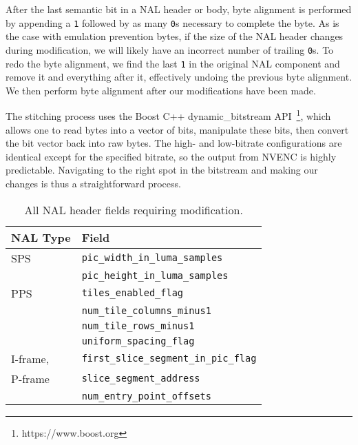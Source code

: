 After the last semantic bit in a NAL header or body, byte alignment is performed by appending a \texttt{1} followed by as many \texttt{0}s necessary to complete the byte. As is the case with emulation prevention bytes, if the size of the NAL header changes during modification, we will likely have an incorrect number of trailing \texttt{0}s. To redo the byte alignment, we find the last \texttt{1} in the original NAL component and remove it and everything after it, effectively undoing the previous byte alignment. We then perform byte alignment after our modifications have been made.

The stitching process uses the Boost C++ dynamic\_bitstream API~\footnote{https://www.boost.org}, which allows one to read bytes into a vector of bits, manipulate these bits, then convert the bit vector back into raw bytes. The high- and low-bitrate configurations are identical except for the specified bitrate, so the output from NVENC is highly predictable. Navigating to the right spot in the bitstream and making our changes is thus a straightforward process.

\setcounter{figure}{1}
\begin{table}
	\begin{tabularx}{\columnwidth}{ll}
		\toprule
		NAL Type & Field \\
		\midrule
		SPS & \texttt{pic\_width\_in\_luma\_samples} \\
		 & \texttt{pic\_height\_in\_luma\_samples}  \\
		\midrule
		PPS & \texttt{tiles\_enabled\_flag}  \\
		& \texttt{num\_tile\_columns\_minus1}  \\
		& \texttt{num\_tile\_rows\_minus1}  \\
		& \texttt{uniform\_spacing\_flag}  \\
		\midrule
		I-frame, & \texttt{first\_slice\_segment\_in\_pic\_flag} \\
		P-frame & \texttt{slice\_segment\_address}  \\
		& \texttt{num\_entry\_point\_offsets}  \\
		\bottomrule
	\end{tabularx}
	\caption{All NAL header fields requiring modification.}
\label{tab:stitch}
\end{table}
\renewcommand{\figurename}{Fig.}
\setcounter{figure}{1}

